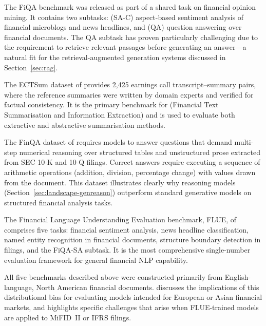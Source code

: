 \begin{context}
The FiQA benchmark \citep{fiqa2018} was released as part of a shared task on financial
opinion mining.  It contains two subtasks: (SA-C) aspect-based sentiment analysis of
financial microblogs and news headlines, and (QA) question answering over financial
documents.  The QA subtask has proven particularly challenging due to the requirement
to retrieve relevant passages before generating an answer---a natural fit for the
retrieval-augmented generation systems discussed in Section~\ref{sec:rag}.

The ECTSum dataset of \citet{mukherjee2022ectsum} provides 2,425 earnings call
transcript--summary pairs, where the reference summaries were written by domain experts
and verified for factual consistency.  It is the primary benchmark for 
(Financial Text Summarisation and Information Extraction) and is used to evaluate
both extractive and abstractive summarisation methods.

The FinQA dataset of \citet{chen2021finqa} requires models to answer questions that
demand multi-step numerical reasoning over structured tables and unstructured prose
extracted from SEC 10-K and 10-Q filings.  Correct answers require executing a
sequence of arithmetic operations (addition, division, percentage change) with values
drawn from the document.  This dataset illustrates clearly why reasoning models
(Section~\ref{sec:landscape-genreason}) outperform standard generative models on
structured financial analysis tasks.

The Financial Language Understanding Evaluation benchmark, FLUE, of
\citet{shah2022flue} comprises five tasks: financial sentiment analysis, news headline
classification, named entity recognition in financial documents, structure boundary
detection in filings, and the FiQA-SA subtask.  It is the most comprehensive
single-number evaluation framework for general financial NLP capability.

\begin{remark}
All five benchmarks described above were constructed primarily from English-language,
North American financial documents.   discusses the implications of this
distributional bias for evaluating models intended for European or Asian financial
markets, and  highlights specific challenges that arise when FLUE-trained
models are applied to MiFID~II or IFRS filings.
\end{remark}

\end{context}

